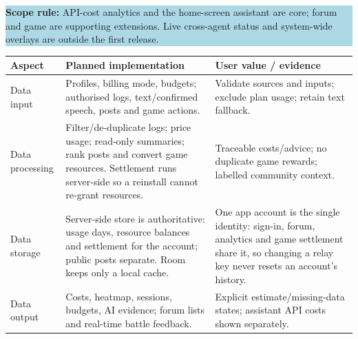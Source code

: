 \documentclass[11pt,a4paper]{article}
\newcommand{\sectkeep}[1]{\vspace{3pt}{\large\bfseries#1}\par\nobreak\vspace{1pt}}
\newcommand{\tagline}[1]{\colorbox{lightblue}{\parbox{\dimexpr\linewidth-2\fboxsep}{#1}}}
\begin{document}
\tagline{\textbf{Scope rule:} API-cost analytics and the home-screen assistant are core; forum and game are supporting extensions. Live cross-agent status and system-wide overlays are outside the first release.}

\newpage
\sectkeep{4. Planned functionality and the four data aspects}
\begin{tabularx}{\linewidth}{@{}>{\raggedright\arraybackslash}p{27mm}Y Y@{}}
\toprule
{}
\textbf{Aspect} & \textbf{Planned implementation} & \textbf{User value / evidence} \\
\midrule
Data input & Profiles, billing mode, budgets; authorised logs, text/confirmed speech, posts and game actions. & Validate sources and inputs; exclude plan usage; retain text fallback. \\
Data processing & Filter/de-duplicate logs; price usage; read-only summaries; rank posts and convert game resources. Settlement runs server-side so a reinstall cannot re-grant resources. & Traceable costs/advice; no duplicate game rewards; labelled community context. \\
Data storage & Server-side store is authoritative: usage days, resource balances and settlement for the account; public posts separate. Room keeps only a local cache. & One app account is the single identity: sign-in, forum, analytics and game settlement share it, so changing a relay key never resets an account's history. \\
Data output & Costs, heatmap, sessions, budgets, AI evidence; forum lists and real-time battle feedback. & Explicit estimate/missing-data states; assistant API costs shown separately. \\
\bottomrule
\end{tabularx}
\end{document}
